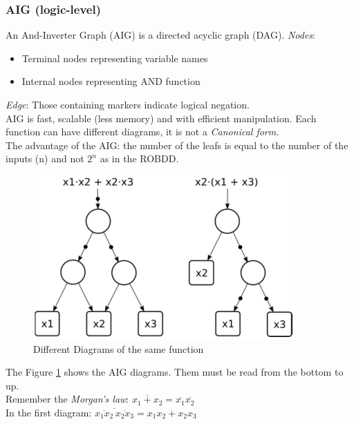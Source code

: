 \subsubsection{AIG (logic-level)}
An And-Inverter Graph (AIG) is a  directed acyclic graph (DAG).
\textit{Nodes}:
\begin{itemize}
\item Terminal nodes representing variable names
\item Internal nodes representing AND function
\end{itemize}
\textit{Edge}: Those containing markers indicate logical negation.\\
AIG is fast, scalable (less memory) and with efficient manipulation. Each function can have different diagrams, it is not a \textit{Canonical form}.\\
The advantage of the AIG: the number of the leafs is equal to the number of the inputs (n) and not $ 2^{n} $ as in the ROBDD.
\begin{figure}[H]
	\centering
	\includegraphics[height=50 mm]{./Cap2/Images/Image07.png}
	\caption[Optional caption]{Different Diagrams of the same function}
	\label{fig:aig}
\end{figure}
The Figure \ref{fig:aig} shows the AIG diagrams. Them must be read from the bottom to up.\\
Remember the \textit{Morgan's law}: $ \overline{x_{1} + x_{2}} = \overline{x_{1}} \overline{x_{2}} $\\
In the first diagram: $ \overline{\overline{x_{1} x_{2}} \, \overline{x_{2} x_{3}}} = x_{1} x_{2} + x_{2} x_{3} $

